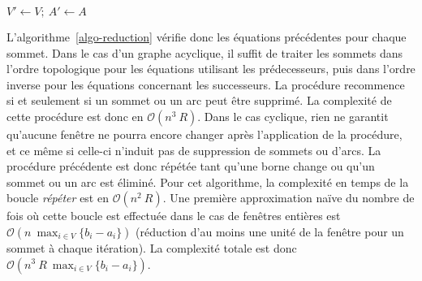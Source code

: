 \documentclass[10pt,francais]{llncs}
\begin{document}
\begin{algorithm}\label{algo-reduction}
\caption{REDUCTION~: R\'eduction des fen\^etres de temps (graphe acyclique)}
\BlankLine
{}
\BlankLine
{$V'\leftarrow V;~A'\leftarrow A$}\;
\end{algorithm}

L'algorithme~\ref{algo-reduction} v\'erifie donc les \'equations pr\'ec\'edentes pour chaque sommet. Dans le cas d'un graphe acyclique, il suffit de traiter les sommets dans l'ordre topologique pour les \'equations utilisant les pr\'edecesseurs, puis dans l'ordre inverse pour les \'equations concernant les successeurs. La proc\'edure recommence si et seulement si un sommet ou un arc peut \^etre supprim\'e. La complexit\'e de cette proc\'edure est donc en $\mathcal{O}(n^3\ R)$. Dans le cas cyclique, rien ne garantit qu'aucune fen\^etre ne pourra encore changer apr\`es l'application de la proc\'edure, et ce m\^eme si celle-ci n'induit pas de suppression de sommets ou d'arcs. La proc\'edure pr\'ec\'edente est donc r\'ep\'et\'ee tant qu'une borne change ou qu'un sommet ou un arc est \'elimin\'e. Pour cet algorithme, la complexit\'e en temps de la boucle \textit{r\'ep\'eter} est en $\mathcal{O}(n^2\ R)$. Une premi\`ere approximation na\"ive du nombre de fois o\`u cette boucle est effectu\'ee dans le cas de fen\^etres enti\`eres est $\displaystyle{\mathcal{O}(n\ \max_{i\in V} \{b_i - a_i \})}$ (r\'eduction d'au moins une unit\'e de la fen\^etre pour un sommet \`a chaque it\'eration). La complexit\'e totale est donc $\displaystyle{\mathcal{O}(n^3\ R\ \max_{i\in V} \{b_i - a_i \})}$.
\end{document}
